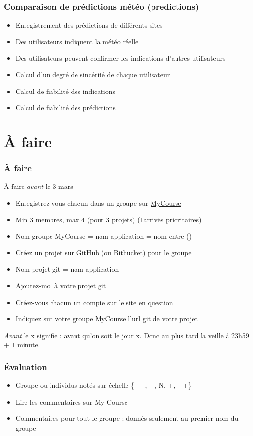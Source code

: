 \documentclass[english, french]{beamer}
\begin{document}
\begin{frame}
	\frametitle{Comparaison de prédictions météo (predictions)}
	\begin{itemize}
		\item Enregistrement des prédictions de différents sites
		\item Des utilisateurs indiquent la météo réelle
		\item Des utilisateurs peuvent confirmer les indications d’autres utilisateurs
		\item Calcul d’un degré de sincérité de chaque utilisateur
		\item Calcul de fiabilité des indications
		\item Calcul de fiabilité des prédictions
	\end{itemize}
\end{frame}

\section{À faire}
\begin{frame}
	\frametitle{À faire}
	\begin{block}{À faire \emph{avant} le 3 mars}
		\begin{itemize}
			\item Enregistrez-vous chacun dans un groupe sur \href{https://mycourse.dauphine.fr/webapps/blackboard/execute/launcher?type=Course&id=_35222_1}{MyCourse}
			\item Min 3 membres, max 4 {\tiny (pour 3 projets)} (1\iers arrivés prioritaires)
			\item Nom groupe MyCourse = nom application = nom entre ()
			\item Créez un projet sur \href{https://github.com/}{GitHub} (ou \href{https://bitbucket.org/}{Bitbucket}) pour le groupe
			\item Nom projet git = nom application
			\item Ajoutez-moi à votre projet git
			\item Créez-vous chacun un compte sur le site en question
			\item Indiquez sur votre groupe MyCourse l’url git de votre projet
		\end{itemize}
	\end{block}
	\emph{Avant} le x signifie : avant qu’on soit le jour x. Donc au plus tard la veille à 23h59 + 1 minute.
\end{frame}

\begin{frame}
	\frametitle{Évaluation}
	\begin{itemize}
		\item Groupe ou individus notés sur échelle \{−{−}, {−}, N, +, ++\}
		\item Lire les commentaires sur My Course
		\item Commentaires pour tout le groupe : donnés seulement au premier nom du groupe
	\end{itemize}
\end{frame}
\end{document}

